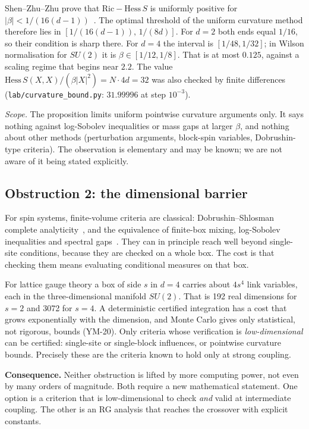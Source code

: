 \documentclass[11pt,a4paper]{article}
\newcommand{\idref}[1]{\textsf{#1}}
\begin{document}
\begin{remark}
Shen--Zhu--Zhu prove that $\mathrm{Ric}-\mathrm{Hess}\,S$ is uniformly positive for $|\beta|<1/(16(d-1))$~\cite{SZZ23}. The optimal threshold of the uniform curvature method therefore lies in $[1/(16(d-1)),\,1/(8d)]$. For $d=2$ both ends equal $1/16$, so their condition is sharp there. For $d=4$ the interval is $[1/48,1/32]$; in Wilson normalisation for $SU(2)$ it is $\beta\in[1/12,1/8]$. That is at most $0.125$, against a scaling regime that begins near $2.2$. The value $\mathrm{Hess}\,S(X,X)/(\beta|X|^2)=N\cdot4d=32$ was also checked by finite differences (\texttt{lab/curvature\_bound.py}: $31.99996$ at step $10^{-3}$).

\emph{Scope.} The proposition limits uniform pointwise curvature arguments only. It says nothing against log-Sobolev inequalities or mass gaps at larger $\beta$, and nothing about other methods (perturbation arguments, block-spin variables, Dobrushin-type criteria). The observation is elementary and may be known; we are not aware of it being stated explicitly.
\end{remark}

\subsection{Obstruction 2: the dimensional barrier}
For spin systems, finite-volume criteria are classical: Dobrushin--Shlosman complete analyticity~\cite{DS87}, and the equivalence of finite-box mixing, log-Sobolev inequalities and spectral gaps~\cite{SZ92,MO94}. They can in principle reach well beyond single-site conditions, because they are checked on a whole box. The cost is that checking them means evaluating conditional measures on that box.

For lattice gauge theory a box of side $s$ in $d=4$ carries about $4s^4$ link variables, each in the three-dimensional manifold $SU(2)$. That is 192 real dimensions for $s=2$ and 3072 for $s=4$. A deterministic certified integration has a cost that grows exponentially with the dimension, and Monte Carlo gives only statistical, not rigorous, bounds (\idref{YM-20}). Only criteria whose verification is \emph{low-dimensional} can be certified: single-site or single-block influences, or pointwise curvature bounds. Precisely these are the criteria known to hold only at strong coupling.

\textbf{Consequence.} Neither obstruction is lifted by more computing power, not even by many orders of magnitude. Both require a new mathematical statement. One option is a criterion that is low-dimensional to check \emph{and} valid at intermediate coupling. The other is an RG analysis that reaches the crossover with explicit constants.
\end{document}
